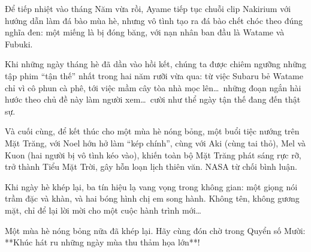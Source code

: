 \documentclass[main.tex]{subfiles}
\begin{document}
Để tiếp nhiệt vào tháng Năm vừa rồi, Ayame tiếp tục chuỗi clip Nakirium với hướng dẫn làm đá bào mùa hè, nhưng vô tình tạo ra đá bào chết chóc theo đúng nghĩa đen: một miếng là bị đóng băng, với nạn nhân ban đầu là Watame và Fubuki.

Khi những ngày tháng hè đã dần vào hồi kết, chúng ta được chiêm ngưỡng những tập phim ``tận thế'' nhất trong hai năm rưỡi vừa qua: từ việc Subaru bẻ Watame chỉ vì cô phun cà phê, tới việc mầm cây tòa nhà mọc lên\dots\ những đoạn ngắn hài hước theo chủ đề này làm người xem\dots\ cười như thể ngày tận thế đang đến thật sự.

Và cuối cùng, để kết thúc cho một mùa hè nóng bỏng, một buổi tiệc nướng trên Mặt Trăng, với Noel hớn hở làm ``kép chính'', cùng với Aki (cùng tai thỏ), Mel và Kuon (hai người bị vô tình kéo vào), khiến toàn bộ Mặt Trăng phát sáng rực rỡ, trở thành Tiểu Mặt Trời, gây hỗn loạn lịch thiên văn. NASA từ chối bình luận.

Khi ngày hè khép lại, ba tín hiệu lạ vang vọng trong không gian: một giọng nói trầm đặc và khàn, và hai bóng hình chị em song hành. Không tên, không gương mặt, chỉ để lại lời mời cho một cuộc hành trình mới\dots

Một mùa hè nóng bỏng nữa đã khép lại. Hãy cùng đón chờ trong Quyển số Mười: **Khúc hát ru những ngày mùa thu thảm họa lớn**!
\end{document}
